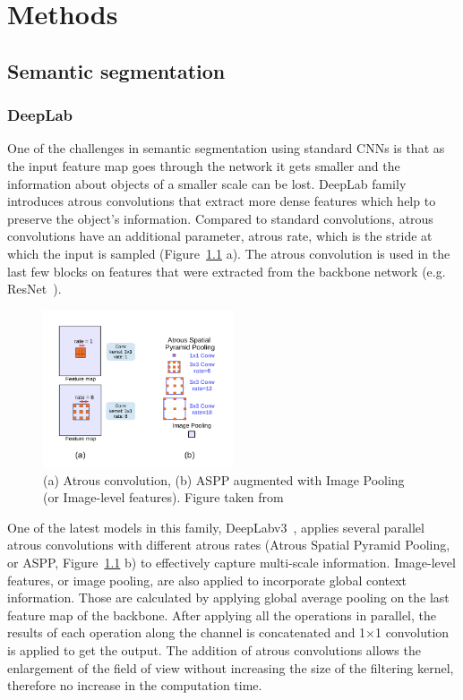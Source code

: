 \chapter{Methods}
\section{Semantic segmentation}
\subsection{DeepLab}
One of the challenges in semantic segmentation using standard CNNs is that as the input feature map goes through the network
it gets smaller and the information about objects of a smaller scale can be lost.
DeepLab family introduces atrous convolutions that extract more dense features
which help to preserve the object's information. Compared to standard convolutions, atrous convolutions have an additional parameter, atrous
rate, which is the stride at which the input is sampled (Figure~\ref*{fig:aconv} a).
The atrous convolution is used in the last few blocks on features that were extracted from the backbone network (e.g. ResNet~\cite{he2016deep}).

\begin{figure}
  \centering
  \includegraphics[width=0.5\textwidth]{figures/conv_aspp.png} %
  \caption{(a) Atrous convolution, (b) ASPP augmented with Image Pooling (or Image-level features). Figure taken from~\cite{chen2017rethinking}} %
  \label{fig:aconv} %
\end{figure}
One of the latest models in this family, DeepLabv3~\cite{chen2017rethinking}, applies several parallel atrous convolutions with different atrous rates
(Atrous Spatial Pyramid Pooling, or ASPP, Figure~\ref*{fig:aconv} b) to effectively capture multi-scale information. 
Image-level features, or image pooling, are also applied to incorporate global context information. Those are calculated by applying global average pooling on the last feature map of the backbone.
After applying all the operations in parallel, the results of each operation along the channel is concatenated and 1$\times$1 convolution is applied to get the output.
The addition of atrous convolutions allows the enlargement of the field of view without
increasing the size of the filtering kernel, therefore no increase in the computation time.

